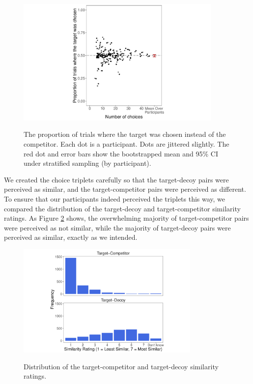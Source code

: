 \documentclass[12pt, a4paper]{article}
\begin{document}
\begin{figure}[htb!]
\centering
		\caption{The proportion of trials where the target was chosen instead of the competitor. Each dot is a participant. Dots are jittered slightly. The red dot and error bars show the bootstrapped mean and 95\% CI under stratified sampling (by participant).}
\includegraphics[width=0.9\textwidth]{figure4.pdf}
\label{fig:exp2_res}
\end{figure}

We created the choice triplets carefully so that the target-decoy pairs were perceived as similar, and the target-competitor pairs were perceived as different. To ensure that our participants indeed perceived the triplets this way, we compared the distribution of the target-decoy and target-competitor similarity ratings. As Figure \ref{fig:exp2_similarityratings} shows, the overwhelming majority of target-competitor pairs were perceived as not similar, while the majority of target-decoy pairs were perceived as similar, exactly as we intended.

\begin{figure}[htb!]
\centering
		\caption{Distribution of the target-competitor and target-decoy similarity ratings.}
\includegraphics[width=0.8\textwidth]{Figure5.pdf}
\label{fig:exp2_similarityratings}
\end{figure}
\end{document}

